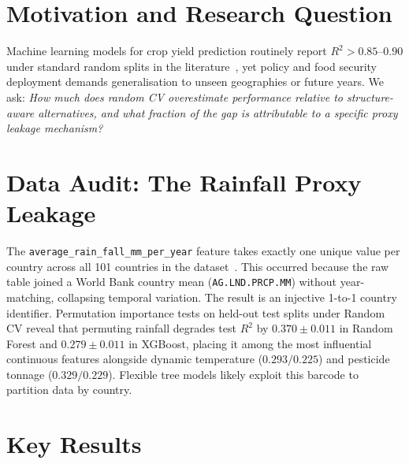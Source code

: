 \documentclass[conference]{IEEEtran}
\begin{document}
\section{Motivation and Research Question}

Machine learning models for crop yield prediction routinely report $R^2 > 0.85\text{--}0.90$ 
under standard random splits in the literature~\cite{vanklompenburg2020}, yet policy and food 
security deployment demands generalisation to unseen geographies or future years. We ask: 
\emph{How much does random CV overestimate performance relative to structure-aware alternatives, 
and what fraction of the gap is attributable to a specific proxy leakage mechanism?}

\section{Data Audit: The Rainfall Proxy Leakage}

The \texttt{average\_rain\_fall\_mm\_per\_year} feature takes exactly one unique 
value per country across all 101 countries in the dataset~\cite{kaggle_cropyield}. 
This occurred because the raw table joined a World Bank country mean 
(\texttt{AG.LND.PRCP.MM}) without year-matching, collapsing temporal variation. 
The result is an injective 1-to-1 country identifier. Permutation importance 
tests on held-out test splits under Random CV reveal that permuting rainfall 
degrades test $R^2$ by $0.370 \pm 0.011$ in Random Forest and $0.279 \pm 0.011$ in XGBoost, 
placing it among the most influential continuous features alongside dynamic temperature 
($0.293 / 0.225$) and pesticide tonnage ($0.329 / 0.229$). Flexible tree models 
likely exploit this barcode to partition data by country.

\section{Key Results}

\begin{table}[h]
\centering
\caption{$R^2$ Summary (Full Features, mean $\pm$ SD / 20 repeated splits)}
\end{table}
\end{document}
